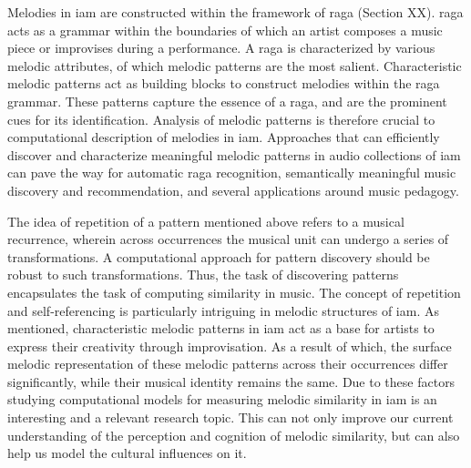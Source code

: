 Melodies in \gls{iam} are constructed within the framework of \gls{raga} (Section XX). \gls{raga} acts as a grammar within the boundaries of which an artist composes a music piece or improvises during a performance. A \gls{raga} is characterized by various melodic attributes, of which melodic patterns are the most salient. Characteristic melodic patterns act as building blocks to construct melodies within the \gls{raga} grammar. These patterns capture the essence of a \gls{raga}, and are the prominent cues for its identification. Analysis of melodic patterns is therefore crucial to computational description of melodies in \gls{iam}. Approaches that can efficiently discover and characterize meaningful melodic patterns in audio collections of \gls{iam} can pave the way for automatic \gls{raga} recognition, semantically meaningful music discovery and recommendation, and several applications around music pedagogy.


The idea of repetition of a pattern mentioned above refers to a musical recurrence, wherein across occurrences the musical unit can undergo a series of transformations. A computational approach for pattern discovery should be robust to such transformations. Thus, the task of discovering patterns encapsulates the task of computing similarity in music.  The concept of repetition and self-referencing is particularly intriguing in melodic structures of \gls{iam}. As mentioned, characteristic melodic patterns in \gls{iam} act as a base for artists to express their creativity through improvisation. As a result of which, the surface melodic representation of these melodic patterns across their occurrences differ significantly, while their musical identity remains the same. Due to these factors studying computational models for measuring melodic similarity in \gls{iam} is an interesting and a relevant research topic. This can not only improve our current understanding of the perception and cognition of melodic similarity, but can also help us model the cultural influences on it. 

